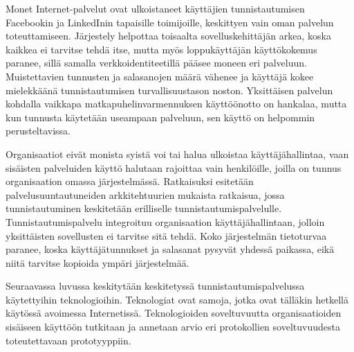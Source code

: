 Monet Internet-palvelut ovat ulkoistaneet käyttäjien tunnistautumisen Facebookin ja LinkedInin tapaisille toimijoille, keskittyen vain oman palvelun toteuttamiseen. Järjestely helpottaa toisaalta sovelluskehittäjän arkea, koska kaikkea ei tarvitse tehdä itse, mutta myös loppukäyttäjän käyttökokemus paranee, sillä samalla verkkoidentiteetillä pääsee moneen eri palveluun. Muistettavien tunnusten ja salasanojen määrä vähenee ja käyttäjä kokee mielekkäänä tunnistautumisen turvallisuustason noston. Yksittäisen palvelun kohdalla vaikkapa matkapuhelinvarmennuksen käyttöönotto on hankalaa, mutta kun tunnusta käytetään useampaan palveluun, sen käyttö on helpommin perusteltavissa.

Organisaatiot eivät monista syistä voi tai halua ulkoistaa käyttäjähallintaa, vaan sisäisten palveluiden käyttö halutaan rajoittaa vain henkilöille, joilla on tunnus organisaation omassa järjestelmässä. Ratkaisuksi esitetään palvelusuuntautuneiden arkkitehtuurien mukaista ratkaisua, jossa tunnistautuminen keskitetään erilliselle tunnistautumispalvelulle. Tunnistautumispalvelu integroituu organisaation käyttäjähallintaan, jolloin yksittäisten sovellusten ei tarvitse sitä tehdä. Koko järjestelmän tietoturvaa paranee, koska käyttäjätunnukset ja salasanat pysyvät yhdessä paikassa, eikä niitä tarvitse kopioida ympäri järjestelmää.

Seuraavassa luvussa keskitytään keskitetyssä tunnistautumispalvelussa käytettyihin teknologioihin. Teknologiat ovat samoja, jotka ovat tälläkin hetkellä käytössä avoimessa Internetissä. Teknologioiden soveltuvuutta organisaatioiden sisäiseen käyttöön tutkitaan ja annetaan arvio eri protokollien soveltuvuudesta toteutettavaan prototyyppiin.